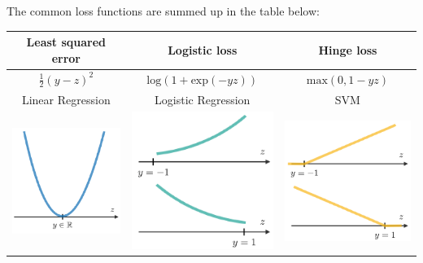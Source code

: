 \documentclass[letterpaper, 10.5pt,landscape]{article}
\begin{document}
\begin{multicols*}{3}
The common loss functions are summed up in the table below:
\begin{center}
    \begin{tabular}{c|c|c}
            \textbf{Least squared error} & \textbf{Logistic loss} & \textbf{Hinge loss} \\
            \hline
             $\frac{1}{2}(y-z)^{2}$ & $\text{log}\left(1+\text{exp}(-yz)\right)$ & $\text{max}(0, 1-yz)$  \\
            \hline 
            Linear Regression & Logistic Regression & SVM \\
            \hline
            \includegraphics[scale = 0.4]{figures/least_squared_loss_func.PNG} &
            \includegraphics[scale = 0.4]{figures/logistic_loss_func.PNG} &
            \includegraphics[scale = 0.4]{figures/hinge_loss_func.PNG}
    \end{tabular}
\end{center}




\end{multicols*}
\end{document}
